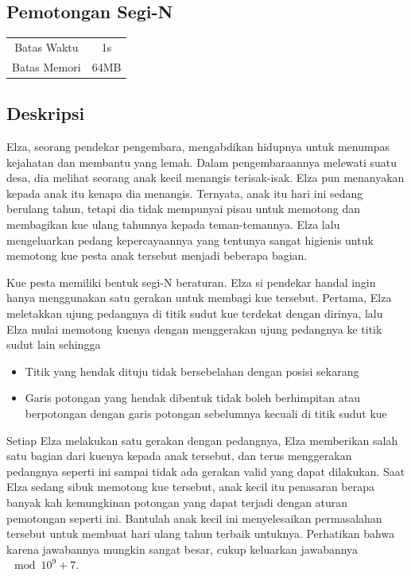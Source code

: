 \documentclass{article}
\begin{document}
\begin{center}
    \section*{Pemotongan Segi-N} %

    \begin{tabular}{ | c c | }
        \hline
        Batas Waktu  & 1s \\    %
        Batas Memori & 64MB \\  %
        \hline
    \end{tabular}
\end{center}

\subsection*{Deskripsi}

Elza, seorang pendekar pengembara, mengabdikan hidupnya untuk menumpas kejahatan dan membantu yang lemah. Dalam pengembaraannya melewati suatu desa, dia melihat seorang anak kecil menangis terisak-isak. Elza pun menanyakan kepada anak itu kenapa dia menangis. Ternyata, anak itu hari ini sedang berulang tahun, tetapi dia tidak mempunyai pisau untuk memotong dan membagikan kue ulang tahunnya kepada teman-temannya. Elza lalu mengeluarkan pedang kepercayaannya yang tentunya sangat higienis untuk memotong kue pesta anak tersebut menjadi beberapa bagian.

Kue pesta memiliki bentuk segi-N beraturan. Elza si pendekar handal ingin hanya menggunakan satu gerakan untuk membagi kue tersebut. Pertama, Elza meletakkan ujung pedangnya di titik sudut kue terdekat dengan dirinya, lalu Elza mulai memotong kuenya dengan menggerakan ujung pedangnya ke titik sudut lain sehingga

\begin{itemize}
    \setlength\itemsep{0pt}
    \item Titik yang hendak dituju tidak bersebelahan dengan posisi sekarang
    \item Garis potongan yang hendak dibentuk tidak boleh berhimpitan atau berpotongan dengan garis potongan sebelumnya kecuali di titik sudut kue
\end{itemize}

Setiap Elza melakukan satu gerakan dengan pedangnya, Elza memberikan salah satu bagian dari kuenya kepada anak tersebut, dan terus menggerakan pedangnya seperti ini sampai tidak ada gerakan valid yang dapat dilakukan. Saat Elza sedang sibuk memotong kue tersebut, anak kecil itu penasaran berapa banyak kah kemungkinan potongan yang dapat terjadi dengan aturan pemotongan seperti ini. Bantulah anak kecil ini menyelesaikan permasalahan tersebut untuk membuat hari ulang tahun terbaik untuknya. Perhatikan bahwa karena jawabannya mungkin sangat besar, cukup keluarkan jawabannya $\mod 10^9 + 7$.
\end{document}
